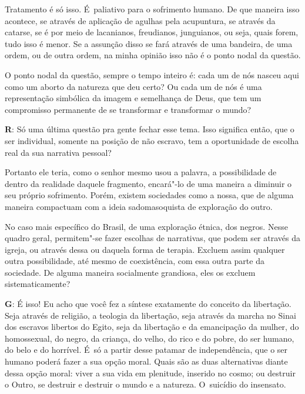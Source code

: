 Tratamento é só isso. É~paliativo para o sofrimento humano. De que
maneira isso acontece, se através de aplicação de agulhas pela
acupuntura, se através da catarse, se é por meio de lacanianos,
freudianos, junguianos, ou seja, quais forem, tudo isso é menor. Se a
assunção disso se fará através de uma bandeira, de uma ordem, ou de
outra ordem, na minha opinião isso não é o ponto nodal da questão.

 

O ponto nodal da questão, sempre o tempo inteiro é: cada um de nós
nasceu aqui como um aborto da natureza que deu certo? Ou cada um de nós
é uma representação simbólica da imagem e semelhança de Deus, que tem um
compromisso permanente de se transformar e transformar o mundo?

 

\textbf{R}: Só uma última questão pra gente fechar esse tema. Isso
significa então, que o ser individual, somente na posição de não
escravo, tem a oportunidade de escolha real da sua narrativa pessoal?

 

Portanto ele teria, como o senhor mesmo usou a palavra, a possibilidade
de dentro da realidade daquele fragmento, encará"-lo de uma maneira a
diminuir o seu próprio sofrimento. Porém, existem sociedades como a
nossa, que de alguma maneira compactuam com a ideia sadomasoquista de
exploração do outro.

 

No caso mais específico do Brasil, de uma exploração étnica, dos negros.
Nesse quadro geral, permitem"-se fazer escolhas de narrativas, que podem
ser através da igreja, ou através dessa ou daquela forma de terapia.
Excluem assim qualquer outra possibilidade, até mesmo de coexistência,
com essa outra parte da sociedade. De alguma maneira socialmente
grandiosa, eles os excluem sistematicamente?

 

\textbf{G}: É isso! Eu acho que você fez a síntese exatamente do
conceito da libertação. Seja através de religião, a teologia da
libertação, seja através da marcha no Sinai dos escravos libertos do
Egito, seja da libertação e da emancipação da mulher, do homossexual, do
negro, da criança, do velho, do rico e do pobre, do ser humano, do belo
e do horrível. É~só a partir desse patamar de independência, que o ser
humano poderá fazer a sua opção moral. Quais são as duas alternativas
diante dessa opção moral: viver a sua vida em plenitude, inserido no
cosmo; ou destruir o Outro, se destruir e destruir o mundo e a natureza.
O~suicídio do insensato.

\fechafala 

